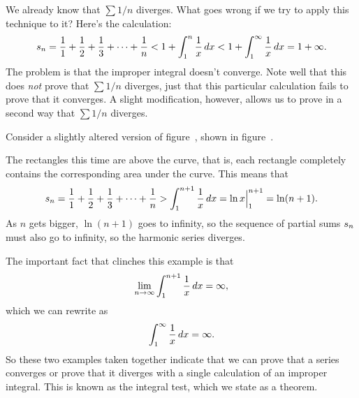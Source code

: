 We already know that $\sum 1/n$ diverges. What goes wrong if we try to
apply this technique to it? Here's the calculation:
$$
  s_n={1\over 1}+{1\over 2}+{1\over 3}+\cdots+{1\over n}
  < 1 + \int_1^n {1\over x}\,dx < 1+\int_1^\infty {1\over x}\,dx 
  =1+\infty.
$$
The problem is that the improper integral doesn't converge. Note well
that this does {\em not\/} prove that $\sum 1/n$ diverges, just that
this particular calculation fails to prove that it converges. A slight
modification, however, allows us to prove in a second way that $\sum
1/n$ diverges. 

\begin{example} Consider a slightly altered version of figure~, shown in figure~.

The rectangles this time are above the curve, that is, each rectangle
completely contains the corresponding area under the curve. This means
that 
$$s_n = {1\over 1}+{1\over 2}+{1\over 3}+\cdots+{1\over n}
> \int_1^{n+1} {1\over x}\,dx = \ln x\Big|_1^{n+1}=\ln(n+1).$$
As $n$ gets bigger, $\ln(n+1)$ goes to infinity, so the sequence of
partial sums $\displaystyle s_n$ must also go to infinity, so the harmonic series
diverges. 
\end{example}

The important fact that clinches this example is that
$$\lim_{n\to\infty} \int_1^{n+1} {1\over x}\,dx = \infty,$$
which we can rewrite as
$$\int_1^\infty {1\over x}\,dx = \infty.$$
So these two examples taken together indicate that we can prove that a
series converges or prove that it diverges with a single calculation
of an improper integral. This is known as the {\dfont integral
  test\/}, 
which we state as a theorem.

